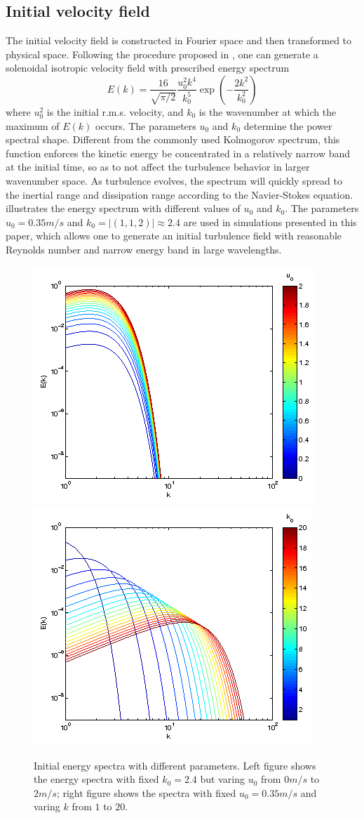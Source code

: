 \documentclass[draft,linenumbers]{AGUJournal}
\begin{document}
\subsection{Initial velocity field}   
The initial velocity field is constructed in Fourier space and then transformed to physical space. Following the procedure proposed in \citet{Rogallo81}, one can generate a solenoidal isotropic velocity field with prescribed energy spectrum \citep{Rosales05}
\begin{equation}
E(k) = \frac{16}{\sqrt{\pi/2}}\frac{u_0^2k^4}{k_0^5}\exp(-\frac{2k^2}{k_0^2})
\end{equation}
where $u_0^2$ is the initial r.m.s. velocity, and $k_0$ is the wavenumber at which the maximum of $E(k)$ occurs. The parameters $u_0$ and $k_0$ determine the power spectral shape. Different from the commonly used Kolmogorov spectrum, this function enforces the kinetic energy be concentrated in a relatively narrow band at the initial time, so as to not affect the turbulence behavior in larger wavenumber space. As turbulence evolves, the spectrum will quickly spread to the inertial range and dissipation range according to the Navier-Stokes equation.  illustrates the energy spectrum with different values of $u_0$ and $k_0$. The parameters $u_0 = 0.35m/s$ and $k_0 = |(1,1,2)| \approx 2.4$ are used in simulations presented in this paper, which allows one to generate an initial turbulence field with reasonable Reynolds number and narrow energy band in large wavelengths.
\begin{figure}\centering
\includegraphics[width=0.48\linewidth]{Figures/eng_spr_u}
\includegraphics[width=0.48\linewidth]{Figures/eng_spr_k}
\caption{Initial energy spectra with different parameters. Left figure shows the energy spectra with fixed $k_0 = 2.4$ but varing $u_0$ from $0m/s$ to $2m/s$; right figure shows the spectra with fixed $u_0 = 0.35m/s$ and varing $k$ from $1$ to $20$.\label{fig:eng_spr}}
\end{figure}
\end{document}
